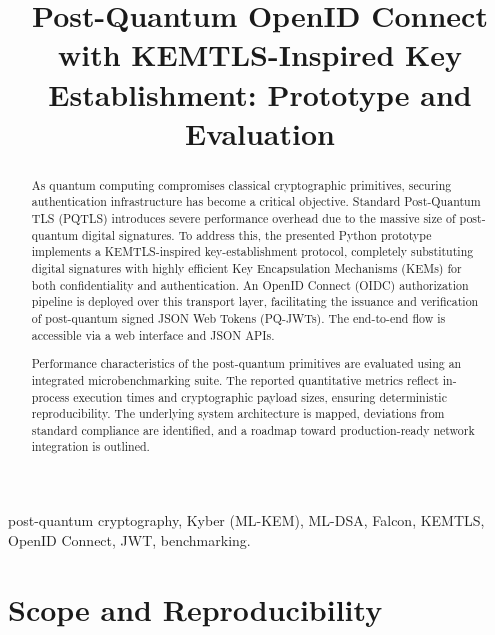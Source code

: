 \documentclass[conference]{IEEEtran}
\title{Post-Quantum OpenID Connect with KEMTLS-Inspired Key Establishment: Prototype and Evaluation}
\author{\IEEEauthorblockN{Aniket Gupta (IIT2023018)}
                \IEEEauthorblockA{Indian Institute of Information Technology, Allahabad\\Repository: \url{https://github.com/42-answer/PQC}}}
\begin{document}
                \maketitle
                
                \begin{abstract}
                As quantum computing compromises classical cryptographic primitives, securing authentication infrastructure has become a critical objective. Standard Post-Quantum TLS (PQTLS) introduces severe performance overhead due to the massive size of post-quantum digital signatures. To address this, the presented Python prototype implements a KEMTLS-inspired key-establishment protocol, completely substituting digital signatures with highly efficient Key Encapsulation Mechanisms (KEMs) for both confidentiality and authentication. An OpenID Connect (OIDC) authorization pipeline is deployed over this transport layer, facilitating the issuance and verification of post-quantum signed JSON Web Tokens (PQ-JWTs). The end-to-end flow is accessible via a web interface and JSON APIs.

                Performance characteristics of the post-quantum primitives are evaluated using an integrated microbenchmarking suite. The reported quantitative metrics reflect in-process execution times and cryptographic payload sizes, ensuring deterministic reproducibility. The underlying system architecture is mapped, deviations from standard compliance are identified, and a roadmap toward production-ready network integration is outlined.
                \end{abstract}
                
                \begin{IEEEkeywords}
                post-quantum cryptography, Kyber (ML-KEM), ML-DSA, Falcon, KEMTLS, OpenID Connect, JWT, benchmarking.
                \end{IEEEkeywords}
                
                \section{Scope and Reproducibility}
\end{document}
